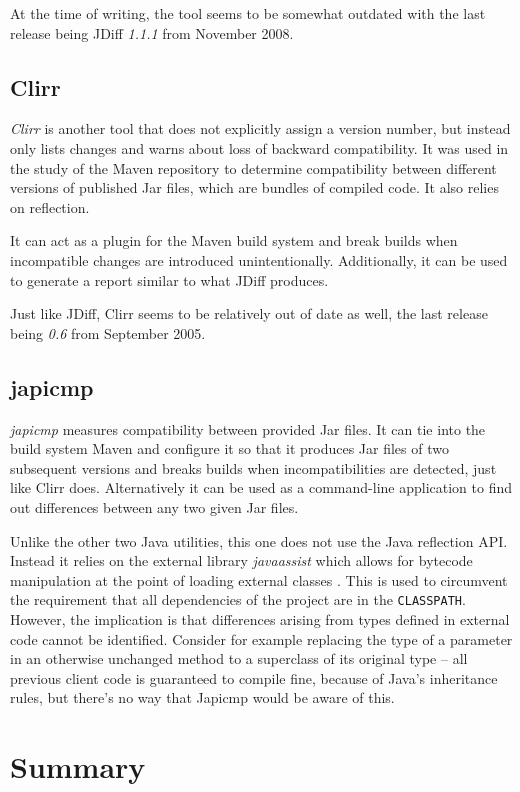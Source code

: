 \documentclass{l4proj}
\newcommand\tricksubsection[1]{
\vspace{-1\baselineskip}\subsection{#1}\vspace{-0.3\baselineskip}}
\newcommand\genericstyle{\lstset{basicstyle=\ttm}}
\newcommand\codeinline[1]{{\genericstyle\lstinline!#1!}}
\begin{document}
At the time of writing, the tool seems to be somewhat outdated with
the last release being JDiff \textit{1.1.1} from November 2008.

\tricksubsection{Clirr}

\textit{Clirr} \cite{Clirr} is another tool that does not explicitly
assign a version number, but instead only lists changes and warns
about loss of backward compatibility. It was used in the study of the
Maven repository \cite{SemverMaven} to determine compatibility between
different versions of published Jar files, which are bundles of
compiled code. It also relies on reflection.

It can act as a plugin for the Maven build system and break builds
when incompatible changes are introduced unintentionally.
Additionally, it can be used to generate a report similar to what
JDiff produces.

Just like JDiff, Clirr seems to be relatively out of date as well, the
last release being  \textit{0.6} from September 2005.

\tricksubsection{japicmp}

\textit{japicmp} \cite{Japicmp} measures compatibility between
provided Jar files. It can tie into the build system Maven and
configure it so that it produces Jar files of two subsequent versions
and breaks builds when incompatibilities are detected, just like Clirr
does. Alternatively it can be used as a command-line application to
find out differences between any two given Jar files.

Unlike the other two Java utilities, this one does not use the Java
reflection API. Instead it relies on the external library
\textit{javaassist} \cite{JavaAssist} which allows for bytecode
manipulation at the point of loading external classes
\cite{BytecodeManip}. This is used to circumvent the requirement that
all dependencies of the project are in the \codeinline{CLASSPATH}.
However, the implication is that differences arising from types
defined in external code cannot be identified. Consider for example
replacing the type of a parameter in an otherwise unchanged method to
a superclass of its original type -- all previous client code is
guaranteed to compile fine, because of Java's inheritance rules, but
there's no way that Japicmp would be aware of this.

\section{Summary}
\end{document}
